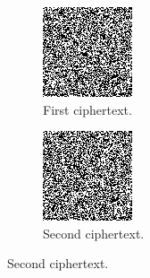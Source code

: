 \documentclass[11pt,ebook,table,dvipsnames]{memoir}
\begin{document}
\begin{figure}[p]
  \begin{subfigure}[b]{.4\textwidth}
    \includegraphics[width=\textwidth]{./Illustrations/KeyReuse/BrokenEncrypted.png}
    \caption{First ciphertext.}
  \end{subfigure}
  \begin{subfigure}[b]{.4\textwidth}
    \includegraphics[width=\textwidth]{./Illustrations/KeyReuse/CryptoEncrypted.png}
    \caption{Second ciphertext.}
  \end{subfigure}


\end{figure}
\end{document}
